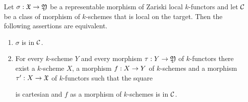 \begin{proposition}\label{proposition:classes_of_morphisms}
Let $\sigma:{\mathfrak X}\rightarrow {\mathfrak Y}$ be a representable morphism of Zariski local $k$-functors and let ${\mathcal C}$ be a class of morphism of $k$-schemes that is local on the target. Then the following assertions are equivalent.
\begin{enumerate}[label=\emph{\textbf{(\roman*)}}, leftmargin=3.0em]
\item $\sigma$ is in ${\mathcal C}$.
\item For every $k$-scheme $Y$ and every morphism $\tau:Y\rightarrow {\mathfrak Y}$ of $k$-functors there exist a $k$-scheme $X$, a morphism $f:X\rightarrow Y$ of $k$-schemes and a morphism $\tau':X\rightarrow {\mathfrak X}$ of $k$-functors such that the square
\begin{center}
\end{center}
is cartesian and $f$ as a morphism of $k$-schemes is in ${\mathcal C}$.
\end{enumerate} 
\end{proposition}

